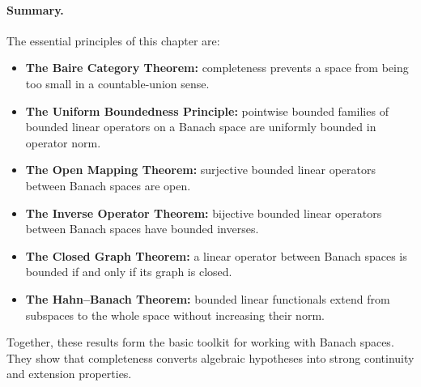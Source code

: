 \paragraph*{Summary.}
The essential principles of this chapter are:
\begin{itemize}
    \item \textbf{The Baire Category Theorem:} completeness prevents a space from being too small in a countable-union sense.
    \item \textbf{The Uniform Boundedness Principle:} pointwise bounded families of bounded linear operators on a Banach space are uniformly bounded in operator norm.
    \item \textbf{The Open Mapping Theorem:} surjective bounded linear operators between Banach spaces are open.
    \item \textbf{The Inverse Operator Theorem:} bijective bounded linear operators between Banach spaces have bounded inverses.
    \item \textbf{The Closed Graph Theorem:} a linear operator between Banach spaces is bounded if and only if its graph is closed.
    \item \textbf{The Hahn--Banach Theorem:} bounded linear functionals extend from subspaces to the whole space without increasing their norm.
\end{itemize}
Together, these results form the basic toolkit for working with Banach spaces. They show that completeness converts algebraic hypotheses into strong continuity and extension properties.
